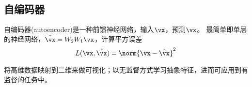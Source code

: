 \subsection{自编码器}
自编码器(autoencoder)是一种前馈神经网络，输入$\vx$，预测$\vx$。
最简单即单层的神经网络，$\tilde{\vx}=W_2W_1\vx$，计算平方误差
\[L(\vx,\tilde{\vx})=\norm{\vx-\tilde{\vx}}^2\]

将高维数据映射到二维来做可视化；以无监督方式学习抽象特征，进而可应用到有监督的任务中。